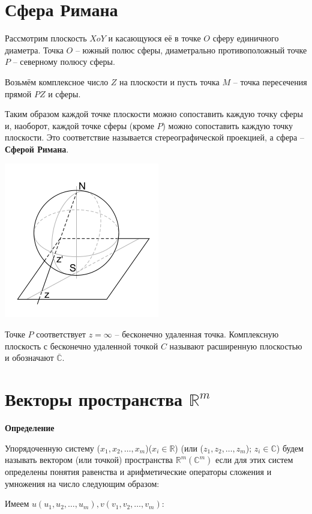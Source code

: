 \documentclass{article}
\theoremstyle{break}
\begin{document}
\section{Сфера Римана}

Рассмотрим плоскость $XoY$ и касающуюся её в точке $O$ сферу
единичного диаметра. Точка $O$ -- южный полюс сферы, диаметрально
противоположный точке $P$ -- северному полюсу сферы. 

Возьмём комплексное число $Z$ на плоскости и пусть точка $M$ --
точка пересечения прямой $PZ$ и сферы.

Таким образом каждой точке плоскости можно сопоставить каждую точку 
сферы и, наоборот, каждой точке сферы (кроме $P$) можно сопоставить
каждую точку плоскости. Это соответствие называется стереографической
проекцией, а сфера -- \textbf{Сферой Римана}. 

\includegraphics[scale=0.5]{riemannsphere}

Точке $P$ соответствует $z = \infty$ -- бесконечно удаленная точка.
Комплексную плоскость с бесконечно удаленной точкой $C$ называют
расширенную плоскостью и обозначают $\overline{\mathbb{C}}$.

\pagebreak

\section{Векторы пространства $\mathbb{R}^m$}

\textbf{Определение}

Упорядоченную систему ($x_1, x_2, \dots, x_m$)($x_i \in \mathbb{R}$)
(или ($z_1, z_2, \dots, z_m$); $z_i \in \mathbb{C}$) будем называть вектором
(или точкой) пространства $\mathbb{R}^m (\mathbb{C}^m)$ если для этих
систем определены понятия равенства и арифметические операторы сложения
и умножения на число следующим образом:

Имеем $u(u_1, u_2, \dots, u_m), v(v_1, v_2, \dots, v_m)$:
\end{document}
